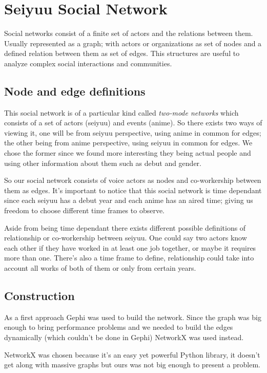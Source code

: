\chapter{Seiyuu Social Network}
Social networks consist of a finite set of actors and the relations between them. Usually represented as a graph; with actors or organizations as set of nodes and a defined relation between them as set of edges. This structures are useful to analyze complex social interactions and communities.

\section{Node and edge definitions}
This social network is of a particular kind called \textit{two-mode networks} which consists of a set of actors (seiyuu) and events (anime). So there exists two ways of viewing it, one will be from seiyuu perspective, using anime in common for edges; the other being from anime perspective, using seiyuu in common for edges. We chose the former since we found more interesting they being actual people and using other information about them such as debut and gender.

So our social network consists of voice actors as nodes and co-workership between them as edges. It's important to notice that this social network is time dependant since each seiyuu has a debut year and each anime has an aired time; giving us freedom to choose different time frames to observe.

Aside from being time dependant there exists different possible definitions of relationship or co-workership between seiyuu. One could say two actors know each other if they have worked in at least one job together, or maybe it requires more than one. There's also a time frame to define, relationship could take into account all works of both of them or only from certain years.\\

\section{Construction}
As a first approach Gephi was used to build the network. Since the graph was big enough to bring performance problems and we needed to build the edges dynamically (which couldn't be done in Gephi) NetworkX was used instead.

NetworkX was chosen because it's an easy yet powerful Python library, it doesn't get along with massive graphs but ours was not big enough to present a problem. 

